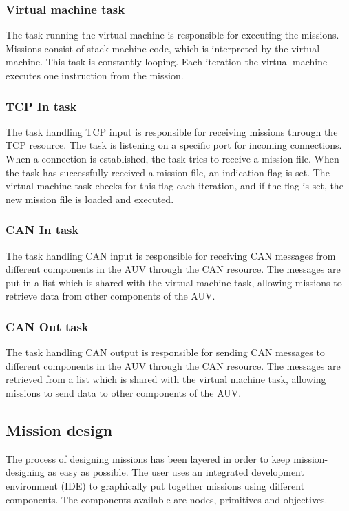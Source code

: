 \subsubsection{Virtual machine task}
The task running the virtual machine is responsible for executing the missions. Missions consist of stack machine code, which is interpreted by the virtual machine. This task is constantly looping. Each iteration the virtual machine executes one instruction from the mission.

\subsubsection{TCP In task}
The task handling TCP input is responsible for receiving missions through the TCP resource. The task is listening on a specific port for incoming connections. When a connection is established, the task tries to receive a mission file. When the task has successfully received a mission file, an indication flag is set. The virtual machine task checks for this flag each iteration, and if the flag is set, the new mission file is loaded and executed.

\subsubsection{CAN In task}
The task handling CAN input is responsible for receiving CAN messages from different components in the AUV through the CAN resource. The messages are put in a list which is shared with the virtual machine task, allowing missions to retrieve data from other components of the AUV.

\subsubsection{CAN Out task}
The task handling CAN output is responsible for sending CAN messages to different components in the AUV through the CAN resource. The messages are retrieved from a list which is shared with the virtual machine task, allowing missions to send data to other components of the AUV.

\subsection{Mission design}
The process of designing missions has been layered in order to keep mission-designing as easy as possible. The user uses an integrated development environment (IDE) to graphically put together missions using different components. The components available are nodes, primitives and objectives.

